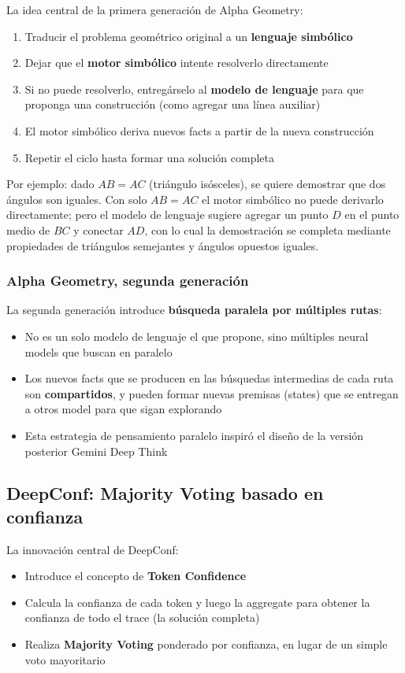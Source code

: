 \documentclass[a4paper]{article}
\begin{document}
La idea central de la primera generación de Alpha Geometry:
\begin{enumerate}
    \item Traducir el problema geométrico original a un \textbf{lenguaje simbólico}
    \item Dejar que el \textbf{motor simbólico} intente resolverlo directamente
    \item Si no puede resolverlo, entregárselo al \textbf{modelo de lenguaje} para que proponga una construcción (como agregar una línea auxiliar)
    \item El motor simbólico deriva nuevos facts a partir de la nueva construcción
    \item Repetir el ciclo hasta formar una solución completa
\end{enumerate}

Por ejemplo: dado $AB = AC$ (triángulo isósceles), se quiere demostrar que dos ángulos son iguales. Con solo $AB = AC$ el motor simbólico no puede derivarlo directamente; pero el modelo de lenguaje sugiere agregar un punto $D$ en el punto medio de $BC$ y conectar $AD$, con lo cual la demostración se completa mediante propiedades de triángulos semejantes y ángulos opuestos iguales.

\subsubsection{Alpha Geometry, segunda generación}

La segunda generación introduce \textbf{búsqueda paralela por múltiples rutas}:
\begin{itemize}
    \item No es un solo modelo de lenguaje el que propone, sino múltiples neural models que buscan en paralelo
    \item Los nuevos facts que se producen en las búsquedas intermedias de cada ruta son \textbf{compartidos}, y pueden formar nuevas premisas (states) que se entregan a otros model para que sigan explorando
    \item Esta estrategia de pensamiento paralelo inspiró el diseño de la versión posterior Gemini Deep Think
\end{itemize}

\subsection{DeepConf: Majority Voting basado en confianza}

La innovación central de DeepConf:
\begin{itemize}
    \item Introduce el concepto de \textbf{Token Confidence}
    \item Calcula la confianza de cada token y luego la aggregate para obtener la confianza de todo el trace (la solución completa)
    \item Realiza \textbf{Majority Voting} ponderado por confianza, en lugar de un simple voto mayoritario
\end{itemize}
\end{document}
